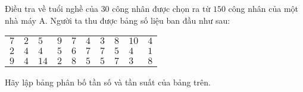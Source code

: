 \begin{bt}
Điều tra về tuổi nghề của $30$ công nhân được chọn ra từ $150$ công nhân của một nhà máy A. Người ta thu được bảng số liệu ban đầu như sau:
\begin{center}
\begin{tabular}{|llllllllll|}
\hline 
$7$ & $2$ & $5$ & $9$ & $7$ & $4$ & $3$ & $8$ & $10$ & $4$ \\ 
$2$ & $4$ & $4$ & $5$ & $6$ & $7$ & $7$ & $5$ & $4$ & $1$ \\ 
$9$ & $4$ & $14$ & $2$ & $8$ & $5$ & $5$ & $7$ & $3$ & $8$ \\ 
\hline 
\end{tabular}
\end{center}
Hãy lập bảng phân bố tần số và tần suất của bảng trên.
\end{bt}

